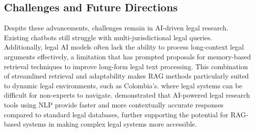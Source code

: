 \subsection{Challenges and Future Directions}
Despite these advancements, challenges remain in AI-driven legal research. 
Existing chatbots still struggle with multi-jurisdictional legal queries. 
Additionally, legal AI models often lack the ability to process long-context 
legal arguments effectively, a limitation that has prompted proposals for 
memory-based retrieval techniques to improve long-form legal text processing.
This combination of streamlined retrieval and adaptability makes RAG methods 
particularly suited to dynamic legal environments, such as Colombia's. where 
legal systems can be difficult for non-experts to navigate. 
\cite{Singh_legal} demonstrated that AI-powered legal research tools using 
NLP provide faster and more contextually accurate responses compared to standard legal 
databases, further supporting the potential for RAG-based systems in making 
complex legal systems more accessible.
\endinput

